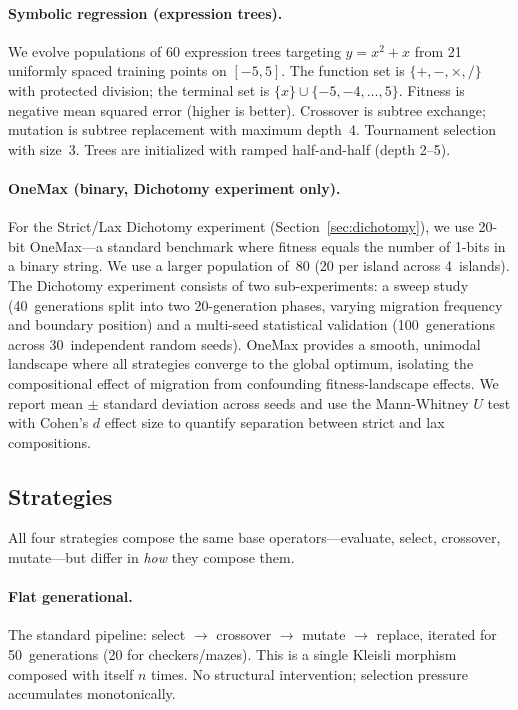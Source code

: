 \documentclass[sigconf,anonymous]{acmart}
\begin{document}
\paragraph{Symbolic regression (expression trees).}
We evolve populations of 60 expression trees targeting $y = x^2 + x$ from 21 uniformly spaced training points on $[-5, 5]$. The function set is $\{+, -, \times, /\}$ with protected division; the terminal set is $\{x\} \cup \{-5, -4, \ldots, 5\}$. Fitness is negative mean squared error (higher is better). Crossover is subtree exchange; mutation is subtree replacement with maximum depth~4. Tournament selection with size~3. Trees are initialized with ramped half-and-half (depth 2--5).

\paragraph{OneMax (binary, Dichotomy experiment only).}
For the Strict/Lax Dichotomy experiment (Section~\ref{sec:dichotomy}), we use 20-bit OneMax---a standard benchmark where fitness equals the number of 1-bits in a binary string. We use a larger population of~80 (20 per island across 4~islands). The Dichotomy experiment consists of two sub-experiments: a sweep study (40~generations split into two 20-generation phases, varying migration frequency and boundary position) and a multi-seed statistical validation (100~generations across 30~independent random seeds). OneMax provides a smooth, unimodal landscape where all strategies converge to the global optimum, isolating the compositional effect of migration from confounding fitness-landscape effects. We report mean $\pm$ standard deviation across seeds and use the Mann-Whitney $U$ test with Cohen's $d$ effect size to quantify separation between strict and lax compositions.

\subsection{Strategies}

All four strategies compose the same base operators---evaluate, select, crossover, mutate---but differ in \emph{how} they compose them.

\paragraph{Flat generational.}
The standard pipeline: select $\to$ crossover $\to$ mutate $\to$ replace, iterated for 50~generations (20 for checkers/mazes). This is a single Kleisli morphism composed with itself $n$ times. No structural intervention; selection pressure accumulates monotonically.
\end{document}
